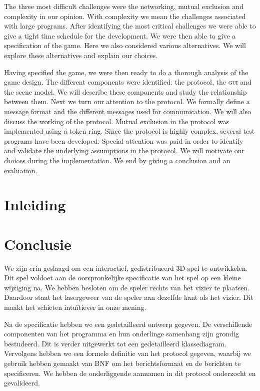 \documentclass[a4paper,11pt, twoside]{article}
\begin{document}
    The three most difficult challenges were the networking, mutual exclusion and complexity in our opinion. With complexity we mean the challenges associated with large programs. After identifying the most critical challenges we were able to give a tight time schedule for the development. We were then able to give a specification of the game. Here we also considered various alternatives. We will explore these alternatives and explain our choices.

    Having specified the game, we were then ready to do a thorough analysis of the game design. The different components were identified: the protocol, the \textsc{gui} and the scene model. We will describe these components and study the relationship between them. Next we turn our attention to the protocol. We formally define a message format and the different messages used for communication. We will also discuss the working of the protocol.
    Mutual exclusion in the protocol was implemented using a token ring. Since the protocol is highly complex, several test programs have been developed. Special attention was paid in order to identify and validate the underlying assumptions in the protocol. We will motivate our choices during the implementation. We end by giving a conclusion and an evaluation.
    \newpage

    \section{Inleiding}
    

    
    
    

    
    

    \section{Conclusie}
    We zijn erin geslaagd om een interactief, gedistribueerd 3D-spel te ontwikkelen. Dit spel voldoet aan de oorspronkelijke specificatie van het spel op een kleine wijziging na. We hebben besloten om de speler rechts van het vizier te plaatsen. Daardoor staat het lasergeweer van de speler aan dezelfde kant als het vizier. Dit maakt het schieten intu\"itiever in onze mening.

    Na de specificatie hebben we een gedetailleerd ontwerp gegeven. De verschillende componenten van het programma en hun onderlinge samenhang zijn grondig bestudeerd. Dit is verder uitgewerkt tot een gedetailleerd klassediagram. Vervolgens hebben we een formele definitie van het protocol gegeven, waarbij we gebruik hebben gemaakt van BNF om het berichtsformaat en de berichten te specificeren. We hebben de onderliggende aannamen in dit protocol onderzocht en gevalideerd.
\end{document}
